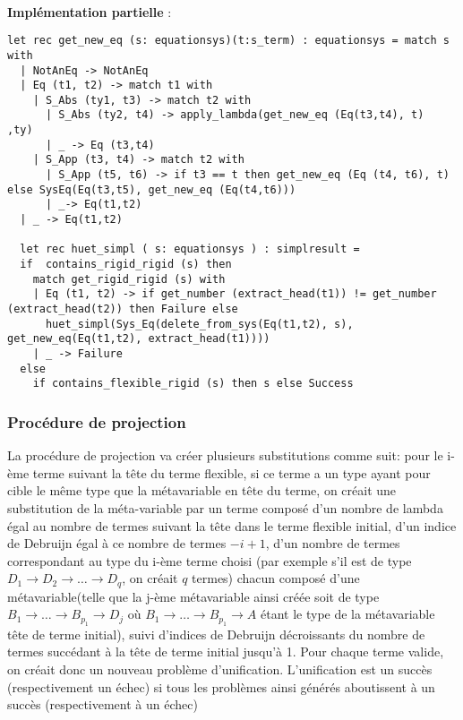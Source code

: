 \paragraph{}
\textbf{Implémentation partielle} :
\begin{lstlisting}
let rec get_new_eq (s: equationsys)(t:s_term) : equationsys = match s with
  | NotAnEq -> NotAnEq
  | Eq (t1, t2) -> match t1 with
    | S_Abs (ty1, t3) -> match t2 with
      | S_Abs (ty2, t4) -> apply_lambda(get_new_eq (Eq(t3,t4), t)  ,ty)
      | _ -> Eq (t3,t4)
    | S_App (t3, t4) -> match t2 with
      | S_App (t5, t6) -> if t3 == t then get_new_eq (Eq (t4, t6), t) else SysEq(Eq(t3,t5), get_new_eq (Eq(t4,t6)))
      | _-> Eq(t1,t2)
  | _ -> Eq(t1,t2)

  let rec huet_simpl ( s: equationsys ) : simplresult = 
  if  contains_rigid_rigid (s) then
    match get_rigid_rigid (s) with
    | Eq (t1, t2) -> if get_number (extract_head(t1)) != get_number (extract_head(t2)) then Failure else
      huet_simpl(Sys_Eq(delete_from_sys(Eq(t1,t2), s), get_new_eq(Eq(t1,t2), extract_head(t1))))
    | _ -> Failure
  else
    if contains_flexible_rigid (s) then s else Success
\end{lstlisting}

\subsubsection{Procédure de projection}
La procédure de projection va créer plusieurs substitutions comme suit: pour le i-ème terme suivant la tête du terme flexible, si ce terme a un type ayant pour cible le même type que la métavariable en tête du terme, on créait une substitution de la méta-variable par un terme composé d'un nombre de lambda égal au nombre de termes suivant la tête dans le terme flexible initial, d'un indice de Debruijn égal à ce nombre de termes $- i + 1$, d'un nombre de termes correspondant au type du i-ème terme choisi (par exemple s'il est de type $D_1 \xrightarrow{} D_2 \xrightarrow{} \dots \xrightarrow{} D_q$, on créait $q$ termes) chacun composé d'une métavariable(telle que la j-ème métavariable ainsi créée soit de type $B_1 \xrightarrow{} \dots \xrightarrow{} B_{p_1} \xrightarrow{} D_j$ où $B_1 \xrightarrow{} \dots \xrightarrow{} B_{p_1} \xrightarrow{} A$ étant le type de la métavariable tête de terme initial), suivi d'indices de Debruijn décroissants du nombre de termes succédant à la tête de terme initial jusqu'à 1.
Pour chaque terme valide, on créait donc un nouveau problème d'unification. L'unification est un succès (respectivement un échec) si tous les problèmes ainsi générés aboutissent à un succès (respectivement à un échec)

